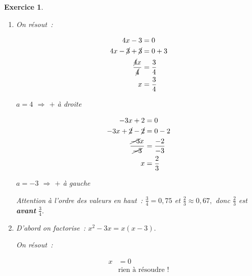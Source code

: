 \documentclass[10pt]{article}
\newtheorem{exo}{Exercice}
\begin{document}
\begin{exo}
\begin{enumerate}
\begin{enumerate}
\item \setlength{\columnseprule}{1pt}

\begin{multicols}{2}

On résout~:

\begin{align*}
4x-3&=0\\
4x-\cancel{3}+\cancel{3}&=0+3\\
\frac{\cancel{4}x}{\cancel{4}}&=\frac{3}{4}\\
x&=\frac{3}{4}
\end{align*}

$a=4$ $\Rightarrow$ $+$ à droite

\columnbreak

\begin{align*}
-3x+2&=0\\
-3x+\cancel{2}-\cancel{2}&=0-2\\
 \frac{\cancel{-3}x}{\cancel{-3}}&=\frac{-2}{-3}\\
 x&=\frac{2}{3}
 \end{align*}
 
 $a=-3$ $\Rightarrow$ $+$ à gauche

\end{multicols}

\medskip

\danger Attention à l'ordre des valeurs en haut~: $\frac{3}{4}=0,75$ et $\frac{2}{3}\approx 0,67,$ donc $\frac{2}{3}$ est \textbf{avant} $\frac{3}{4}.$

\begin{center}
\end{center}

\item D'abord on factorise~: $x^2-3x=x(x-3).$

\setlength{\columnseprule}{1pt}

\begin{multicols}{2}


On résout~:

\begin{align*}
x&=0\\
&\text{rien à résoudre~!}
\end{align*}


\end{multicols}
\end{enumerate}
\end{enumerate}
\end{exo}
\end{document}

